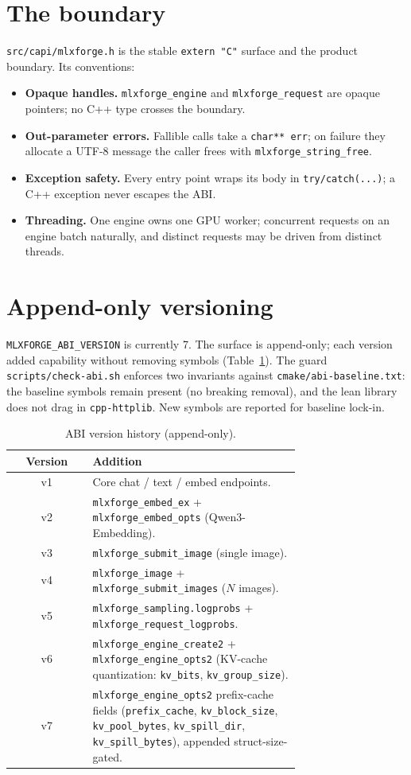 \documentclass[11pt,a4paper]{report}
\newcommand{\code}[1]{\texttt{#1}}
\begin{document}
\section{The boundary}
\code{src/capi/mlxforge.h} is the stable \code{extern "C"} surface and the product
boundary. Its conventions:
\begin{itemize}[nosep]
  \item \textbf{Opaque handles.} \code{mlxforge\_engine} and \code{mlxforge\_request}
        are opaque pointers; no C++ type crosses the boundary.
  \item \textbf{Out-parameter errors.} Fallible calls take a \code{char** err}; on
        failure they allocate a UTF-8 message the caller frees with
        \code{mlxforge\_string\_free}.
  \item \textbf{Exception safety.} Every entry point wraps its body in
        \code{try/catch(...)}; a C++ exception never escapes the ABI.
  \item \textbf{Threading.} One engine owns one GPU worker; concurrent requests on an
        engine batch naturally, and distinct requests may be driven from distinct
        threads.
\end{itemize}

\section{Append-only versioning}
\code{MLXFORGE\_ABI\_VERSION} is currently 7. The surface is append-only; each
version added capability without removing symbols (Table~\ref{tab:abi}). The guard
\code{scripts/check-abi.sh} enforces two invariants against
\code{cmake/abi-baseline.txt}: the baseline symbols remain present (no breaking
removal), and the lean library does not drag in \code{cpp-httplib}. New symbols are
reported for baseline lock-in.

\begin{table}[h]
\centering
\caption{ABI version history (append-only).}
\label{tab:abi}
\small
\begin{tabular}{@{}c p{0.72\linewidth}@{}}
\toprule
Version & Addition \\
\midrule
v1 & Core chat / text / embed endpoints. \\
v2 & \code{mlxforge\_embed\_ex} + \code{mlxforge\_embed\_opts} (Qwen3-Embedding). \\
v3 & \code{mlxforge\_submit\_image} (single image). \\
v4 & \code{mlxforge\_image} + \code{mlxforge\_submit\_images} ($N$ images). \\
v5 & \code{mlxforge\_sampling.logprobs} + \code{mlxforge\_request\_logprobs}. \\
v6 & \code{mlxforge\_engine\_create2} + \code{mlxforge\_engine\_opts2}
     (KV-cache quantization: \code{kv\_bits}, \code{kv\_group\_size}). \\
v7 & \code{mlxforge\_engine\_opts2} prefix-cache fields (\code{prefix\_cache},
     \code{kv\_block\_size}, \code{kv\_pool\_bytes}, \code{kv\_spill\_dir},
     \code{kv\_spill\_bytes}), appended struct-size-gated. \\
\bottomrule
\end{tabular}
\end{table}
\end{document}
